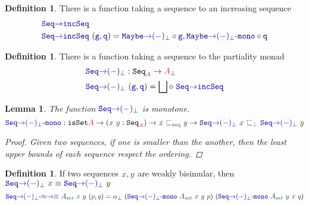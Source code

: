 \documentclass[twoside,11pt,openright]{report}
\theoremstyle{plain} %
\newtheorem{lem}[thm]{Lemma}
\theoremstyle{definition}
\newtheorem{defn}[thm]{Definition}%
\theoremstyle{remark}
\newcommand*{\term}[1]{\textcolor{green!30!black}{#1}} %
\newcommand*{\type}[1]{\textcolor{magenta!90!black}{#1}}
\newcommand*{\relation}[1]{\textcolor{gray!75!black}{\ensuremath{\mathtt{#1}}}}
\newcommand*{\function}[1]{\textcolor{blue!60!black}{\ensuremath{\mathtt{#1}}}}
\newcommand*{\constructor}[1]{\textcolor{purple!60!black}{\ensuremath{\mathtt{#1}}}}
\newcommand*{\typeformer}[1]{\ensuremath{\mathtt{#1}}}
\begin{document}
\begin{defn}
  There is a function taking a sequence to an increasing sequence 
  \begin{equation}
    \begin{aligned}
      &\function{Seq{\rightarrow}incSeq} \\
      &\function{Seq{\rightarrow}incSeq}~(\function{g} , \function{q}) = \function{Maybe{\rightarrow}(-)_\bot} \circ \function{g} , \function{Maybe{\rightarrow}(-)_\bot\text{-}mono} \circ \function{q}
    \end{aligned}
  \end{equation}
\end{defn}
\begin{defn}
  There is a function taking a sequence to the partiality monad
  \begin{equation}
    \begin{aligned}
      &\function{Seq{\rightarrow}(-)_\bot} : \typeformer{Seq}_{\type{A}} \rightarrow \type{A}_{\bot} \\
      &\function{Seq{\rightarrow}(-)_\bot}~(\function{g},\function{q}) = \bigsqcup \circ~\function{Seq{\rightarrow}incSeq}
    \end{aligned}
  \end{equation}
\end{defn}
\begin{lem}
  The function \(\function{Seq{\rightarrow}(-)_\bot}\) is monotone. 
  \begin{equation}
    \function{Seq{\rightarrow}(-)_\bot\text{-}mono} : \typeformer{isSet} \type{A} \rightarrow (\term{x}~\term{y} : \typeformer{Seq}_{\type{A}}) \rightarrow \term{x}~\relation{\sqsubseteq_{seq}}~\term{y} \rightarrow \function{Seq{\rightarrow}(-)_\bot}~\term{x}~\relation{\sqsubseteq_{\bot}}~\function{Seq{\rightarrow}(-)_\bot}~\term{y}
\end{equation}
  \begin{proof}
    Given two sequences, if one is smaller than the another, then the least upper bounds of each sequence respect the ordering. 
  \end{proof}
\end{lem}
\begin{defn}
  If two sequences \(\term{x},\term{y}\) are weakly bisimular, then \(\function{Seq{\rightarrow}(-)_\bot}~\term{x} \equiv \function{Seq{\rightarrow}(-)_\bot}~\term{y}\)
\begin{equation}
  \function{Seq{\rightarrow}(-)_\bot\text{-}{\approx}{\rightarrow}{\equiv}}~\term{A_{set}}~\term{x}~\term{y}~(\term{p} , \term{q}) = \constructor{\alpha_{\bot}}~(\function{Seq{\rightarrow}(-)_\bot\text{-}mono}~\term{A_{set}}~\term{x}~\term{y}~\term{p})~(\function{Seq{\rightarrow}(-)_\bot\text{-}mono}~\term{A_{set}}~\term{y}~\term{x}~\term{q})
\end{equation}
\end{defn}
\end{document}
